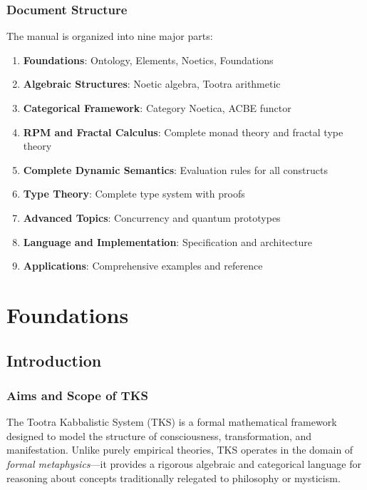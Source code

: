 \documentclass[11pt,twoside,openright]{book}
\theoremstyle{definition}
\theoremstyle{plain}
\theoremstyle{remark}
\begin{document}
\section*{Document Structure}

The manual is organized into nine major parts:
\begin{enumerate}
  \item \textbf{Foundations}: Ontology, Elements, Noetics, Foundations
  \item \textbf{Algebraic Structures}: Noetic algebra, Tootra arithmetic
  \item \textbf{Categorical Framework}: Category Noetica, ACBE functor
  \item \textbf{RPM and Fractal Calculus}: Complete monad theory and fractal type theory
  \item \textbf{Complete Dynamic Semantics}: Evaluation rules for all constructs
  \item \textbf{Type Theory}: Complete type system with proofs
  \item \textbf{Advanced Topics}: Concurrency and quantum prototypes
  \item \textbf{Language and Implementation}: Specification and architecture
  \item \textbf{Applications}: Comprehensive examples and reference
\end{enumerate}

\mainmatter

\part{Foundations}

\chapter{Introduction}
\label{ch:introduction}

\section{Aims and Scope of TKS}

The Tootra Kabbalistic System (TKS) is a formal mathematical framework designed to model the structure of consciousness, transformation, and manifestation. Unlike purely empirical theories, TKS operates in the domain of \emph{formal metaphysics}---it provides a rigorous algebraic and categorical language for reasoning about concepts traditionally relegated to philosophy or mysticism.
\end{document}

